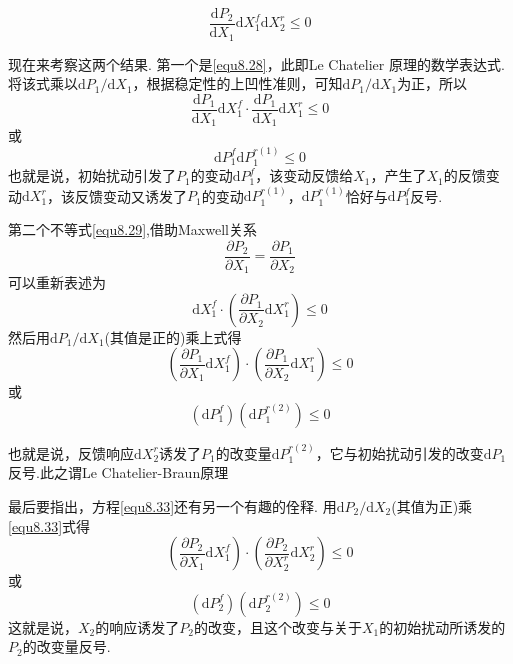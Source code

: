 \begin{equation}
\label{equ8.29}
\frac{\text{d}P_2}{\text{d}X_1}\text{d}X_1^f\text{d}X_2^r\le 0
\end{equation}

现在来考察这两个结果. 第一个是\eqref{equ8.28}，此即Le Chatelier 原理的数学表达式. 将该式乘以$\text{d}P_1/\text{d}X_1 $，根据稳定性的上凹性准则，可知$\text{d}P_1/\text{d}X_1$为正，所以
\begin{equation}
\label{equ8.30}
\frac{\text{d}P_1}{\text{d}X_1} \text{d}X_1^f\cdot \frac{\text{d}P_1}{\text{d}X_1} \text{d}X_1^r \le 0
\end{equation}
或
\begin{equation}
\label{equ8.31}
{\text{d}P_1^f}{\text{d}P_1^{r(1)}} \le 0
\end{equation}
也就是说，初始扰动引发了$P_1$的变动$\text{d}{P_1^f}$，该变动反馈给$X_1$，产生了$X_1$的反馈变动$\text{d}X_1^r$，该反馈变动又诱发了$P_1$的变动$\text{d}P_1^{r(1)} $，$\text{d}P_1^{r(1)} $恰好与$\text{d}{P_1^f}$反号.

第二个不等式\eqref{equ8.29},借助Maxwell关系
\begin{equation}
\label{equ8.32}
\frac{\partial P_2}{\partial X_1}=\frac{\partial P_1}{\partial X_2}
\end{equation}
可以重新表述为
\begin{equation}
\label{equ8.33}
\text{d}X_1^f\cdot\left(\frac{\partial P_1}{\partial X_2}\text{d}X_1^r \right)\leq 0 
\end{equation}
然后用$\text{d}P_1 /\text{d}X_1$(其值是正的)乘上式得
\begin{equation}
\label{equ8.34}
\left(\frac{\partial P_1}{\partial X_1}\text{d}X_1^f\right)\cdot \left(\frac{\partial P_1}{\partial X_2}\text{d}X_1^r\right)\leq 0
\end{equation}
或
\begin{equation}
\label{equ8.35}
(\text{d}P_1^f )(\text{d}P_1^{r(2)} )\leq 0
\end{equation}

也就是说，反馈响应$\text{d}X_2^r$诱发了$P_1$的改变量$\text{d}P_1^{r(2)} $，它与初始扰动引发的改变$\text{d}P_1 $反号.此之谓Le Chatelier-Braun原理

最后要指出，方程\eqref{equ8.33}还有另一个有趣的佺释. 用$\text{d}P_2/\text{d}X_2$(其值为正)乘\eqref{equ8.33}式得
\begin{equation}
\label{equ8.36}
\left(\frac{\partial P_2}{\partial X_1}\text{d}X_1^f\right)\cdot \left(\frac{\partial P_2}{\partial X_2^r}\text{d}X_2^r\right)\leq 0
\end{equation}
或
\begin{equation}
(\text{d}P_2^f )(\text{d}P_2^{r(2)} )\leq 0
\end{equation}
这就是说，$X_2$的响应诱发了$P_2$的改变，且这个改变与关于$X_1$的初始扰动所诱发的$P_2$的改变量反号.
